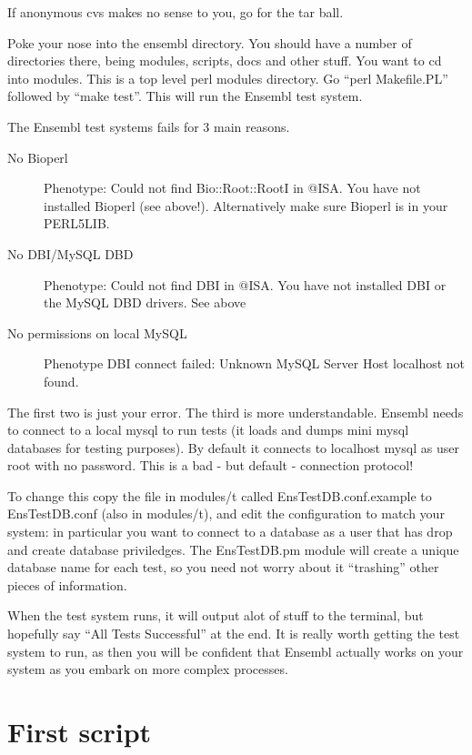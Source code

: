 \documentclass[11pt,a4paper]{article}
\begin{document}
If anonymous cvs makes no sense to you, go for the tar ball.

Poke your nose into the ensembl directory. You should have a number of directories there, being
modules, scripts, docs and other stuff. You want to cd into modules. This is a top level 
perl modules directory. Go ``perl Makefile.PL'' followed by ``make test''. This will run the
Ensembl test system.

The Ensembl test systems fails for 3 main reasons.

\begin{description}
\item[No Bioperl] Phenotype: Could not find Bio::Root::RootI in @ISA. You have not installed Bioperl
(see above!). Alternatively make sure Bioperl is in your PERL5LIB.
\item[No DBI/MySQL DBD] Phenotype: Could not find DBI in @ISA. You have not installed DBI or the
MySQL DBD drivers. See above 

\item[No permissions on local MySQL]
Phenotype DBI connect failed: Unknown MySQL Server Host localhost not
found.  

\end{description} 

The first two is just your error. The third is more
understandable. Ensembl needs to connect to a local mysql to run tests
(it loads and dumps mini mysql databases for testing purposes). By
default it connects to localhost mysql as user root with no
password. This is a bad - but default - connection protocol!

To change this copy the file in modules/t called
EnsTestDB.conf.example to EnsTestDB.conf (also in modules/t), and edit
the configuration to match your system: in particular you want to
connect to a database as a user that has drop and create database
priviledges. The EnsTestDB.pm module will create a unique database
name for each test, so you need not worry about it ``trashing'' other
pieces of information.

When the test system runs, it will output alot of stuff to the terminal, but hopefully say
``All Tests Successful'' at the end. It is really worth getting the test system to run, as then you
will be confident that Ensembl actually works on your system as you embark on more complex processes.

\section{First script}
\end{document}

